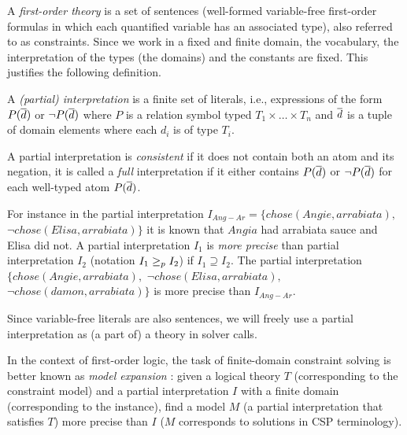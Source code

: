 A \emph{first-order theory} is a set of sentences (well-formed variable-free first-order formulas in which each quantified variable has an associated type), also referred to as constraints.
Since we work in a fixed and finite domain, the vocabulary, the interpretation of the types (the domains) and the constants are fixed.
This justifies the following definition. 
\begin{definition}
 A \emph{(partial) interpretation} is a finite set of literals, i.e., expressions of the form $P(\overline{d})$ or $\lnot P(\overline{d})$ where $P$ is a relation symbol typed $T_1\times\dots \times T_n$ and $\overline{d}$ is a tuple of domain elements where each $d_i$ is of type $T_i$. 

 A partial interpretation is \emph{consistent} if it does not contain both an atom and its negation, it is called a \emph{full} interpretation if it either contains $P(\overline{d})$ or $\lnot P(\overline{d})$ for each well-typed atom $P(\overline{d})$. 
\end{definition}
For instance in the partial interpretation $I_{Ang-Ar}=\{chose(Angie,arrabiata),$ $\lnot chose(Elisa,arrabiata)\}$ it is known that $Angia$ had arrabiata sauce and Elisa did not. 
% 
A partial interpretation $I_1$ is \emph{more precise} than partial interpretation $I_2$ (notation $I_1\geq_p I_2$) if $I_1\supseteq I_2$.
The partial interpretation $\{chose(Angie,arrabiata),$ $\lnot chose(Elisa,arrabiata),$ $ \lnot chose(damon,arrabiata)\}$ is more precise than $I_{Ang-Ar}$. 

Since variable-free literals are also sentences, we will freely use a partial interpretation as (a part of) a theory in solver calls. 

In the context of first-order logic, the task of finite-domain constraint solving is better known as \emph{model expansion} \cite{MitchellTHM06}: given a logical theory $T$ (corresponding to the constraint model) and a partial interpretation $I$ with a finite domain (corresponding to the instance), find a model $M$ (a partial interpretation that satisfies $T$) more precise than $I$ ($M$ corresponds to solutions in CSP terminology).

